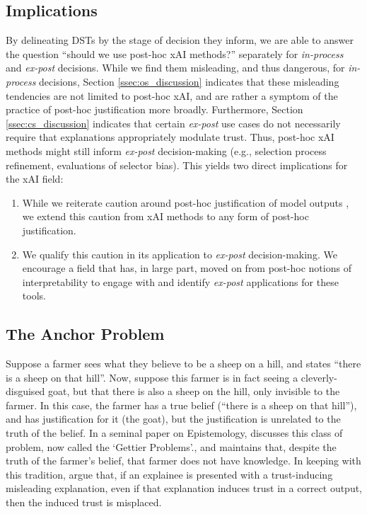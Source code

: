 \subsection{Implications}
By delineating DSTs by the stage of decision they inform, we are able to answer the question ``should we use post-hoc xAI methods?'' separately for \emph{in-process} and \emph{ex-post} decisions. While we find them misleading, and thus dangerous, for \emph{in-process} decisions, Section \ref{ssec:os_discussion} indicates that these misleading tendencies are not limited to post-hoc xAI, and are rather a symptom of the practice of post-hoc justification more broadly. Furthermore, Section \ref{ssec:cs_discussion} indicates that certain \emph{ex-post} use cases do not necessarily require that explanations appropriately modulate trust. Thus, post-hoc xAI methods might still inform \emph{ex-post} decision-making (e.g., selection process refinement, evaluations of selector bias). This yields two direct implications for the xAI field:

\begin{enumerate}
    \item While we reiterate caution around post-hoc justification of model outputs \cite{Miller_2023, Lipton, Bansal-et-al, Ford-et-al, Jacobs-et-al}, we extend this caution from xAI methods to any form of post-hoc justification.
    \item We qualify this caution in its application to \emph{ex-post} decision-making. We encourage a field that has, in large part, moved on from post-hoc notions of interpretability \cite{kumar_problems_2020,Barocas_Selbst_Raghavan_2020,Lipton,Karimi_Schölkopf_Valera_2021} to engage with and identify \emph{ex-post} applications for these tools.
\end{enumerate}

\subsection{The Anchor Problem}\label{ssec:anchor_problem}
Suppose a farmer sees what they believe to be a sheep on a hill, and states ``there is a sheep on that hill''. Now, suppose this farmer is in fact seeing a cleverly-disguised goat, but that there is also a sheep on the hill, only invisible to the farmer. In this case, the farmer has a true belief (``there is a sheep on that hill''), and has justification for it (the goat), but the justification is unrelated to the truth of the belief. In a seminal paper on Epistemology, \textcite{Gettier_1963} discusses this class of problem, now called the `Gettier Problems'., and maintains that, despite the truth of the farmer's belief, that farmer does not have knowledge. In keeping with this tradition, \textcite{Cabitza_Fregosi_Campagner_Natali_2024} argue that, if an explainee is presented with a trust-inducing misleading explanation, even if that explanation induces trust in a correct output, then the induced trust is misplaced.

